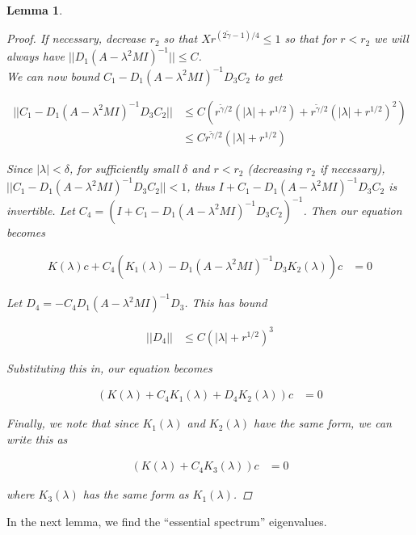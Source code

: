 \documentclass[12pt]{article}
\newtheorem{lemma}{Lemma}
\begin{document}
\begin{lemma}
\begin{proof}
If necessary, decrease $r_2$ so that $X r^{(2 \tilde{\gamma} - 1)/4} \leq 1$ so that for $r < r_2$ we will always have $|| D_1 (A - \lambda^2 MI)^{-1} || \leq C$.\\

We can now bound $C_1 - D_1 (A - \lambda^2 MI)^{-1} D_3 C_2$ to get

\begin{align*}
|| C_1 - D_1 (A - \lambda^2 MI)^{-1} D_3 C_2 || &\leq C \left( r^{\tilde{\gamma}/2} (|\lambda| + r^{1/2}) + r^{\tilde{\gamma}/2} (|\lambda| + r^{1/2})^2 \right) \\
&\leq C r^{\tilde{\gamma}/2} (|\lambda| + r^{1/2}) 
\end{align*}

Since $|\lambda| < \delta$, for sufficiently small $\delta$ and $r < r_2$ (decreasing $r_2$ if necessary), $|| C_1 - D_1 (A - \lambda^2 MI)^{-1} D_3 C_2 || < 1$, thus $I + C_1 - D_1 (A - \lambda^2 MI)^{-1} D_3 C_2$ is invertible. Let $C_4 = (I + C_1 - D_1 (A - \lambda^2 MI)^{-1} D_3 C_2)^{-1}$. Then our equation becomes

\begin{align*}
K(\lambda)c + C_4(K_1(\lambda) - D_1 (A - \lambda^2 MI)^{-1} D_3 K_2(\lambda))c &= 0
\end{align*}

Let $D_4 = -C_4 D_1 (A - \lambda^2 MI)^{-1} D_3$. This has bound

\begin{align*}
||D_4|| &\leq C (|\lambda| + r^{1/2})^3
\end{align*}

Substituting this in, our equation becomes

\begin{align*}
(K(\lambda) + C_4 K_1(\lambda) + D_4 K_2(\lambda))c &= 0
\end{align*}

Finally, we note that since $K_1(\lambda)$ and $K_2(\lambda)$ have the same form, we can write this as

\begin{align*}
(K(\lambda) + C_4 K_3(\lambda))c &= 0
\end{align*}

where $K_3(\lambda)$ has the same form as $K_1(\lambda)$.

\end{proof}
\end{lemma}

In the next lemma, we find the ``essential spectrum'' eigenvalues.
\end{document}
